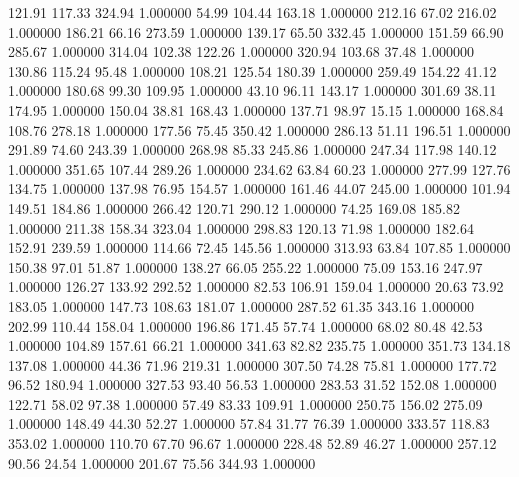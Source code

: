     121.91    117.33    324.94  1.000000
     54.99    104.44    163.18  1.000000
    212.16     67.02    216.02  1.000000
    186.21     66.16    273.59  1.000000
    139.17     65.50    332.45  1.000000
    151.59     66.90    285.67  1.000000
    314.04    102.38    122.26  1.000000
    320.94    103.68     37.48  1.000000
    130.86    115.24     95.48  1.000000
    108.21    125.54    180.39  1.000000
    259.49    154.22     41.12  1.000000
    180.68     99.30    109.95  1.000000
     43.10     96.11    143.17  1.000000
    301.69     38.11    174.95  1.000000
    150.04     38.81    168.43  1.000000
    137.71     98.97     15.15  1.000000
    168.84    108.76    278.18  1.000000
    177.56     75.45    350.42  1.000000
    286.13     51.11    196.51  1.000000
    291.89     74.60    243.39  1.000000
    268.98     85.33    245.86  1.000000
    247.34    117.98    140.12  1.000000
    351.65    107.44    289.26  1.000000
    234.62     63.84     60.23  1.000000
    277.99    127.76    134.75  1.000000
    137.98     76.95    154.57  1.000000
    161.46     44.07    245.00  1.000000
    101.94    149.51    184.86  1.000000
    266.42    120.71    290.12  1.000000
     74.25    169.08    185.82  1.000000
    211.38    158.34    323.04  1.000000
    298.83    120.13     71.98  1.000000
    182.64    152.91    239.59  1.000000
    114.66     72.45    145.56  1.000000
    313.93     63.84    107.85  1.000000
    150.38     97.01     51.87  1.000000
    138.27     66.05    255.22  1.000000
     75.09    153.16    247.97  1.000000
    126.27    133.92    292.52  1.000000
     82.53    106.91    159.04  1.000000
     20.63     73.92    183.05  1.000000
    147.73    108.63    181.07  1.000000
    287.52     61.35    343.16  1.000000
    202.99    110.44    158.04  1.000000
    196.86    171.45     57.74  1.000000
     68.02     80.48     42.53  1.000000
    104.89    157.61     66.21  1.000000
    341.63     82.82    235.75  1.000000
    351.73    134.18    137.08  1.000000
     44.36     71.96    219.31  1.000000
    307.50     74.28     75.81  1.000000
    177.72     96.52    180.94  1.000000
    327.53     93.40     56.53  1.000000
    283.53     31.52    152.08  1.000000
    122.71     58.02     97.38  1.000000
     57.49     83.33    109.91  1.000000
    250.75    156.02    275.09  1.000000
    148.49     44.30     52.27  1.000000
     57.84     31.77     76.39  1.000000
    333.57    118.83    353.02  1.000000
    110.70     67.70     96.67  1.000000
    228.48     52.89     46.27  1.000000
    257.12     90.56     24.54  1.000000
    201.67     75.56    344.93  1.000000
